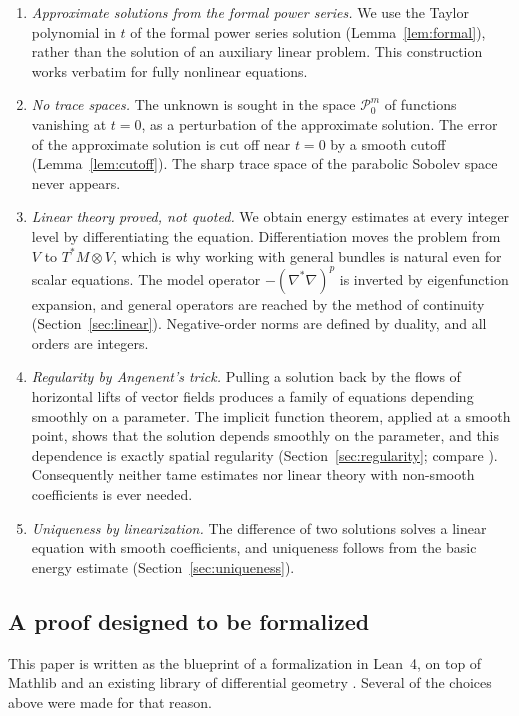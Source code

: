 \documentclass[11pt,reqno]{amsart}
\theoremstyle{definition}
\theoremstyle{remark}
\newcommand{\Pp}{\mathcal{P}}
\newcommand{\Lap}{\nabla^{*}\nabla}
\numberwithin{equation}{section}
\begin{document}
\begin{enumerate}[label=(\arabic*)]
\item \emph{Approximate solutions from the formal power series.} We use the Taylor polynomial in $t$
  of the formal power series solution (Lemma~\ref{lem:formal}), rather than the solution of an
  auxiliary linear problem. This construction works verbatim for fully nonlinear equations.
\item \emph{No trace spaces.} The unknown is sought in the space $\Pp^m_0$ of functions vanishing at
  $t=0$, as a perturbation of the approximate solution. The error of the approximate solution is cut
  off near $t=0$ by a smooth cutoff (Lemma~\ref{lem:cutoff}). The sharp trace space of the parabolic
  Sobolev space never appears.
\item \emph{Linear theory proved, not quoted.} We obtain energy estimates at every integer level by
  differentiating the equation. Differentiation moves the problem from $V$ to $T^*M\otimes V$, which is
  why working with general bundles is natural even for scalar equations. The model operator
  $-(\Lap)^p$ is inverted by eigenfunction expansion, and general operators are reached by the method
  of continuity (Section~\ref{sec:linear}). Negative-order norms are defined by duality, and all
  orders are integers.
\item \emph{Regularity by Angenent's trick.} Pulling a solution back by the flows of horizontal lifts
  of vector fields produces a family of equations depending smoothly on a parameter. The implicit
  function theorem, applied at a smooth point, shows that the solution depends smoothly on the
  parameter, and this dependence is exactly spatial regularity (Section~\ref{sec:regularity}; compare
  \cite{Angenent90}). Consequently neither tame estimates nor linear theory with non-smooth
  coefficients is ever needed.
\item \emph{Uniqueness by linearization.} The difference of two solutions solves a linear equation
  with smooth coefficients, and uniqueness follows from the basic energy estimate
  (Section~\ref{sec:uniqueness}).
\end{enumerate}

\subsection{A proof designed to be formalized}

This paper is written as the blueprint of a formalization in Lean~4, on top of Mathlib \cite{mathlib}
and an existing library of differential geometry \cite{DGlib}. Several of the choices above were made
for that reason.
\end{document}
